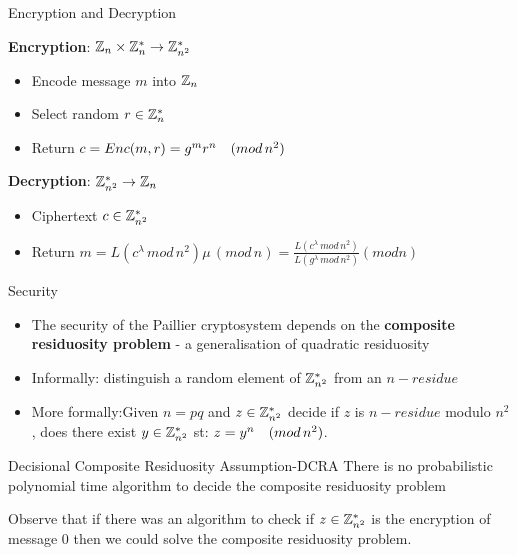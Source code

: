 \documentclass{beamer}
\begin{document}
\begin{frame}{Encryption and Decryption}

\textbf{Encryption}: $\mathbb{Z}_{n} \times \mathbb{Z}_{n}^* \rightarrow \mathbb{Z}_{n^2}^*$

\begin{itemize}
\item Encode message $m$ into $\mathbb{Z}_{n}$
\item Select random $r \in \mathbb{Z}_{n}^*$
\item Return $c = Enc(m,r) = g^m  r^n \quad (mod \, {n^2})$
\end{itemize}
 
\textbf{Decryption}: $\mathbb{Z}_{n^2}^* \rightarrow \mathbb{Z}_{n}$
 
\begin{itemize}
\item Ciphertext $c \in \mathbb{Z}_{n^2}^*$
\item Return $m = L(c^\lambda \, mod \, n^2)  \mu \, ( mod \, n) = \frac{L(c^\lambda \, mod \, n^2)}{L(g^\lambda \, mod \, n^2)} (mod n) $
\end{itemize}

\end{frame}

\begin{frame}{Security}
\begin{itemize}
\item The security of the Paillier cryptosystem depends on the \textbf{composite residuosity problem} - a generalisation of quadratic residuosity
\item Informally: distinguish a random element of $\mathbb{Z}_{n^2}^*$ from an $n-residue$
\item More formally:Given $n=p  q$ and $z \in \mathbb{Z}_{n^2}^*$ decide if $z$ is $n-residue$ modulo $n^2$, does there exist $y \in \mathbb{Z}_{n^2}^*$ st: $z = y^n \quad (mod \, {n^2})$. 
\end{itemize}
 

\begin{block}{Decisional Composite Residuosity Assumption-DCRA}
There is no probabilistic polynomial time algorithm to decide the composite residuosity problem
\end{block}

Observe that if there was an algorithm to check if $z \in \mathbb{Z}_{n^2}^*$ is the encryption of message $0$ then we could solve the composite residuosity problem. 
\end{frame}
\end{document}
